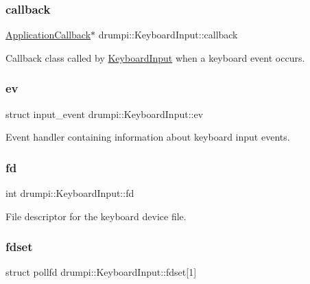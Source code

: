 \subsubsection{\texorpdfstring{callback}{callback}}
{\footnotesize\ttfamily \hyperlink{classdrumpi_1_1ApplicationCallback}{Application\+Callback}$\ast$ drumpi\+::\+Keyboard\+Input\+::callback}

Callback class called by \hyperlink{classdrumpi_1_1KeyboardInput}{Keyboard\+Input} when a keyboard event occurs. \mbox{\label{classdrumpi_1_1KeyboardInput_a2b530250c3bb5d744611671e430e283d}} 
\subsubsection{\texorpdfstring{ev}{ev}}
{\footnotesize\ttfamily struct input\+\_\+event drumpi\+::\+Keyboard\+Input\+::ev\hspace{0.3cm}{\ttfamily [private]}}

Event handler containing information about keyboard input events. \mbox{\label{classdrumpi_1_1KeyboardInput_a098990e43175ae8a2ad64e6d3b487c83}} 
\subsubsection{\texorpdfstring{fd}{fd}}
{\footnotesize\ttfamily int drumpi\+::\+Keyboard\+Input\+::fd\hspace{0.3cm}{\ttfamily [private]}}

File descriptor for the keyboard device file. \mbox{\label{classdrumpi_1_1KeyboardInput_a94851cf204554afc60046d39a265c4e7}} 
\subsubsection{\texorpdfstring{fdset}{fdset}}
{\footnotesize\ttfamily struct pollfd drumpi\+::\+Keyboard\+Input\+::fdset\mbox{[}1\mbox{]}\hspace{0.3cm}{\ttfamily [private]}}

